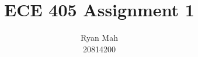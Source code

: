 \documentclass[12pt]{article}
\begin{document}
\title{ECE 405 Assignment 1}
\author{Ryan Mah \\ 20814200}
\date{\vspace{-2ex}}
\maketitle


\end{document}

